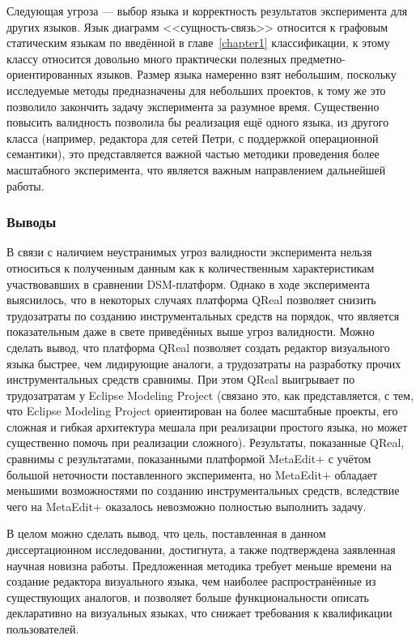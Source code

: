 Следующая угроза --- выбор языка и корректность результатов эксперимента для других языков.
Язык диаграмм <<сущность-связь>> относится к графовым статическим языкам по введённой 
в главе~\ref{chapter1} классификации, к этому классу относится довольно много практически полезных 
предметно-ориентированных языков. Размер языка намеренно взят небольшим, поскольку
исследуемые методы предназначены для небольших проектов, к тому же это позволило закончить
задачу эксперимента за разумное время. Существенно повысить валидность позволила бы реализация
ещё одного языка, из другого класса (например, редактора для сетей Петри, с поддержкой
операционной семантики), это представляется важной частью методики проведения более масштабного
эксперимента, что является важным направлением дальнейшей работы.

\subsubsection{Выводы}
В связи с наличием неустранимых угроз валидности эксперимента нельзя относиться к полученным
данным как к количественным характеристикам участвовавших в сравнении DSM-платформ.
Однако в ходе эксперимента выяснилось, что в некоторых случаях платформа QReal позволяет снизить
трудозатраты по созданию инструментальных средств на порядок, что является показательным
даже в свете приведённых выше угроз валидности. Можно сделать вывод, что платформа
QReal позволяет создать редактор визуального языка быстрее, чем лидирующие аналоги,
а трудозатраты на разработку прочих инструментальных средств сравнимы. При этом QReal
выигрывает по трудозатратам у Eclipse Modeling Project (связано это, как представляется, 
с тем, что Eclipse Modeling Project ориентирован на более масштабные проекты, его
сложная и гибкая архитектура мешала при реализации простого языка, но может существенно
помочь при реализации сложного). Результаты, показанные QReal, сравнимы с результатами,
показанными платформой MetaEdit+ с учётом большой неточности поставленного эксперимента,
но MetaEdit+ обладает меньшими возможностями по созданию инструментальных средств, 
вследствие чего на MetaEdit+ оказалось невозможно полностью выполнить задачу.

В целом можно сделать вывод, что цель, поставленная в данном диссертационном исследовании, 
достигнута, а также подтверждена заявленная научная новизна работы. Предложенная 
методика требует меньше времени на создание редактора визуального языка, чем наиболее 
распространённые из существующих аналогов, и позволяет больше функциональности описать
декларативно на визуальных языках, что снижает требования к квалификации пользователей.

